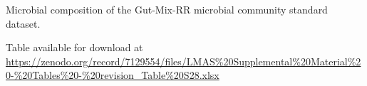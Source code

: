 \begin{table}[]
\centering
\caption{Microbial composition of the Gut-Mix-RR microbial community standard dataset.}
\label{tab:ch5_suptable28}
Table available for download at \url{https://zenodo.org/record/7129554/files/LMAS\%20Supplemental\%20Material\%20-\%20Tables\%20-\%20revision_Table\%20S28.xlsx}
\end{table}